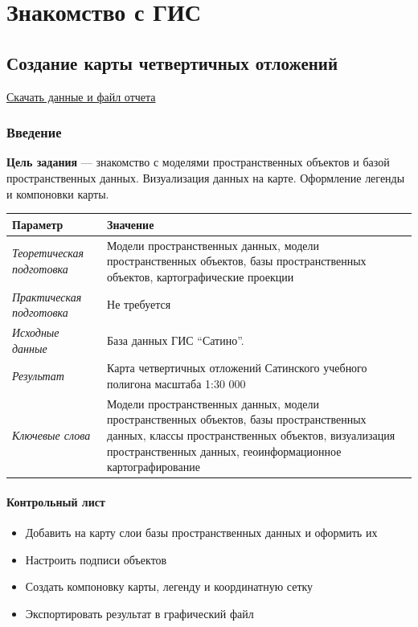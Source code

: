 \documentclass[]{book}
\providecommand{\tightlist}{%
  \setlength{\itemsep}{0pt}\setlength{\parskip}{0pt}}
\theoremstyle{definition}
\theoremstyle{definition}
\theoremstyle{definition}
\theoremstyle{remark}
\begin{document}
\hypertarget{part---}{%
\part{Знакомство с ГИС}\label{part---}}

\hypertarget{map-design-quaternary}{%
\chapter{Создание карты четвертичных
отложений}\label{map-design-quaternary}}

\href{http://autolab.geogr.msu.ru/gis/data/Ex01.zip}{Скачать данные и
файл отчета}

\hypertarget{map-design-quaternary-intro}{%
\section{Введение}\label{map-design-quaternary-intro}}

\textbf{Цель задания} --- знакомство с моделями пространственных
объектов и базой пространственных данных. Визуализация данных на карте.
Оформление легенды и компоновки карты.

\begin{longtable}[]{@{}ll@{}}
\toprule
Параметр & Значение\tabularnewline
\midrule
\endhead
\emph{Теоретическая подготовка} & Модели пространственных данных, модели
пространственных объектов, базы пространственных объектов,
картографические проекции\tabularnewline
\emph{Практическая подготовка} & Не требуется\tabularnewline
\emph{Исходные данные} & База данных ГИС ``Сатино''.\tabularnewline
\emph{Результат} & Карта четвертичных отложений Сатинского учебного
полигона масштаба 1:30 000\tabularnewline
\emph{Ключевые слова} & Модели пространственных данных, модели
пространственных объектов, базы пространственных данных, классы
пространственных объектов, визуализация пространственных данных,
геоинформационное картографирование\tabularnewline
\bottomrule
\end{longtable}

\hypertarget{map-design-quaternary-control}{%
\subsection{Контрольный лист}\label{map-design-quaternary-control}}

\begin{itemize}
\tightlist
\item
  Добавить на карту слои базы пространственных данных и оформить их
\item
  Настроить подписи объектов
\item
  Создать компоновку карты, легенду и координатную сетку
\item
  Экспортировать результат в графический файл
\end{itemize}
\end{document}
